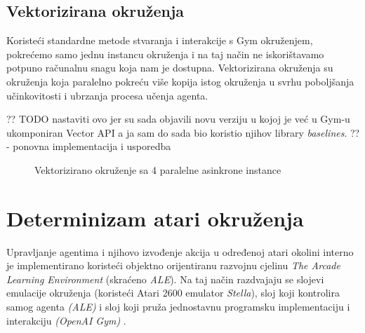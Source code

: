 \subsection{Vektorizirana okruženja}

Koristeći standardne metode stvaranja i interakcije s Gym okruženjem, pokrećemo samo jednu instancu okruženja i na taj način ne iskorištavamo potpuno računalnu snagu koja nam je dostupna. Vektorizirana okruženja  su okruženja koja paralelno pokreću više kopija istog okruženja u svrhu poboljšanja učinkovitosti i ubrzanja procesa učenja agenta.

?? TODO nastaviti ovo jer su sada objavili novu verziju u kojoj je već u Gym-u ukomponiran Vector API a ja sam do sada bio koristio njihov library \textit{baselines}. ?? - ponovna implementacija i usporedba

\begin{figure}[H]
    \centering
    \caption{Vektorizirano okruženje sa 4 paralelne asinkrone instance}
    \label{fig:breakout-vect}
\end{figure}

\section{Determinizam atari okruženja}

Upravljanje agentima i njihovo izvođenje akcija u određenoj atari okolini interno je implementirano koristeći objektno orijentiranu razvojnu cjelinu  \textit{The Arcade Learning Environment} (skraćeno \textit{ALE}). Na taj način razdvajaju se slojevi emulacije okruženja (koristeći Atari 2600 emulator \textit{Stella}), sloj koji kontrolira samog agenta \textit{(ALE)} i sloj koji pruža jednostavnu programsku implementaciju i interakciju \textit{(OpenAI Gym)} \cite{OpenAIALE}. 

